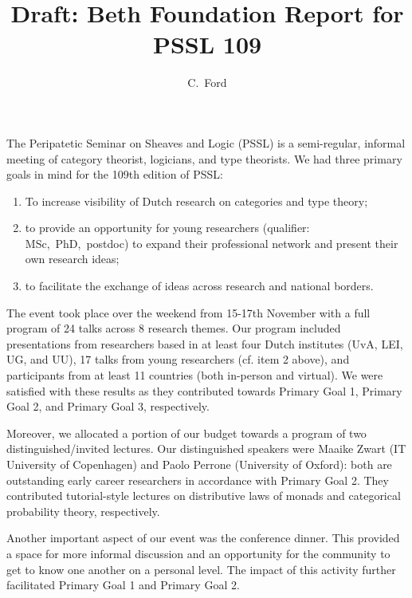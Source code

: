 \documentclass[11pt, oneside]{article}   	%
\title{Draft: Beth Foundation Report for PSSL 109}
\author{C.~Ford}
\begin{document}
\maketitle

The Peripatetic Seminar on Sheaves and Logic (PSSL) is a semi-regular,
informal meeting of category theorist, logicians, and type theorists. We had
three primary goals in mind for the 109th edition of PSSL:
\begin{enumerate}
\item
To increase visibility of Dutch research on categories and type theory;
\item
to provide an opportunity for young researchers (qualifier: MSc,~PhD,~postdoc) 
to expand their professional network and present their own research ideas;
\item
to facilitate the exchange of ideas across research and national borders.
\end{enumerate}

The event took place over the weekend from 15-17th November with a
full program of 24 talks across 8 research themes. Our program included
presentations from researchers based in at least four Dutch institutes (UvA, 
LEI, UG, and UU), 17 talks from young researchers (cf. item 2 above), and
participants from at least 11 countries (both in-person and virtual). We were 
satisfied with these results as they contributed towards Primary Goal 1, 
Primary Goal 2, and Primary Goal 3, respectively. 

Moreover, we allocated a portion of our budget towards a program of two 
distinguished/invited lectures. Our distinguished speakers were Maaike Zwart 
(IT University of Copenhagen) and Paolo Perrone (University of Oxford): both 
are outstanding early career researchers in accordance with Primary Goal 2. 
They contributed tutorial-style lectures on distributive laws of monads and 
categorical probability theory, respectively.

Another important aspect of our event was the conference dinner. This 
provided a space for more informal discussion and an opportunity for the
community to get to know one another on a personal level. The impact of
this activity further facilitated Primary Goal 1 and Primary Goal 2.		
\end{document}

